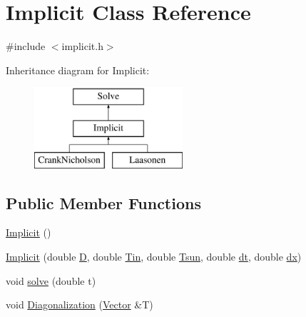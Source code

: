 \hypertarget{class_implicit}{}\section{Implicit Class Reference}
\label{class_implicit}


{\ttfamily \#include $<$implicit.\+h$>$}

Inheritance diagram for Implicit\+:\begin{figure}[H]
\begin{center}
\leavevmode
\includegraphics[height=3.000000cm]{class_implicit}
\end{center}
\end{figure}
\subsection*{Public Member Functions}
\begin{DoxyCompactItemize}
\item 
\hyperlink{class_implicit_a5a98f30bdf419368901ce9468a7065a3}{Implicit} ()
\item 
\hyperlink{class_implicit_afe5ef51232ab8925009f584c679bdfce}{Implicit} (double \hyperlink{class_solve_ab6b73352e9bca73bad1b133fc84f008c}{D}, double \hyperlink{class_solve_a324c747af91a26a206d7772853b8655e}{Tin}, double \hyperlink{class_solve_a7145536b49fb1ac4d2f36f800d118616}{Tsun}, double \hyperlink{class_solve_ac1befb9c006f895fb0517e19c412ca57}{dt}, double \hyperlink{class_solve_a21b9b8118f508e079f066d2ce2816dd1}{dx})
\item 
void \hyperlink{class_implicit_a027adb4276376991f75fcffbd34740b3}{solve} (double t)
\item 
void \hyperlink{class_implicit_a572fff2232977c83c432f993f37a7853}{Diagonalization} (\hyperlink{class_vector}{Vector} \&T)
\end{DoxyCompactItemize}
